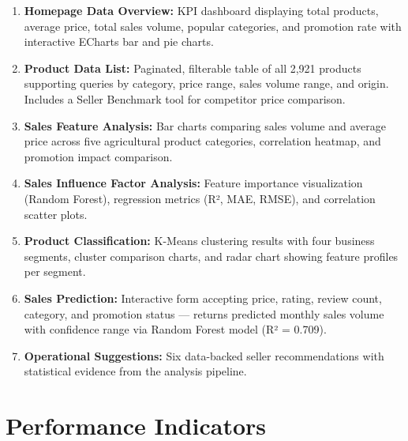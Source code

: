 \documentclass[12pt,a4paper]{report}
\begin{document}
\begin{enumerate}[itemsep=3pt]
  \item \textbf{Homepage Data Overview:} KPI dashboard displaying total products, average price, total sales volume, popular categories, and promotion rate with interactive ECharts bar and pie charts.
  \item \textbf{Product Data List:} Paginated, filterable table of all 2,921 products supporting queries by category, price range, sales volume range, and origin. Includes a Seller Benchmark tool for competitor price comparison.
  \item \textbf{Sales Feature Analysis:} Bar charts comparing sales volume and average price across five agricultural product categories, correlation heatmap, and promotion impact comparison.
  \item \textbf{Sales Influence Factor Analysis:} Feature importance visualization (Random Forest), regression metrics (R², MAE, RMSE), and correlation scatter plots.
  \item \textbf{Product Classification:} K-Means clustering results with four business segments, cluster comparison charts, and radar chart showing feature profiles per segment.
  \item \textbf{Sales Prediction:} Interactive form accepting price, rating, review count, category, and promotion status --- returns predicted monthly sales volume with confidence range via Random Forest model (R² = 0.709).
  \item \textbf{Operational Suggestions:} Six data-backed seller recommendations with statistical evidence from the analysis pipeline.
\end{enumerate}

\section{Performance Indicators}
\end{document}
